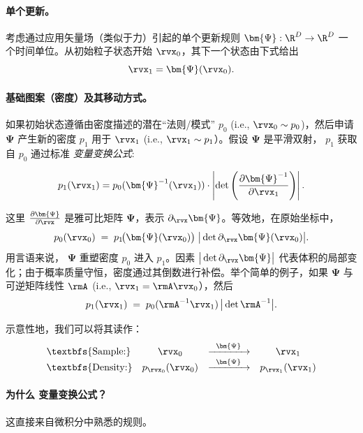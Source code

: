 \paragraph{单个更新。}
考虑通过应用矢量场（类似于力）引起的单个更新规则
$\bm{\Psi}:\R^D \to \R^D$ 一个时间单位。从初始粒子状态开始 $\rvx_0$，其下一个状态由下式给出
\[
\rvx_1 = \bm{\Psi}(\rvx_0).
\]

\paragraph{基础图案（密度）及其移动方式。}
如果初始状态遵循由密度描述的潜在“法则/模式” $p_0$ (i.e., $\rvx_0\sim p_0$)，然后申请 $\bm{\Psi}$ 产生新的密度 $p_1$ 用于 $\rvx_1$ (i.e., $\rvx_1\sim p_1$）。假设 $\bm{\Psi}$ 是平滑双射， $p_1$ 获取自 $p_0$ 通过标准 \emph{变量变换公式}:
\begin{mdframed}
\begin{equation}\label{eq:change-of-variable-density}
p_{1}(\rvx_1) = p_{0}(\bm{\Psi}^{-1}(\rvx_1)) \cdot \left| \det \left( \frac{\partial \bm{\Psi}^{-1}}{\partial \rvx_1} \right) \right|.
\end{equation}
\end{mdframed}
这里 $\tfrac{\partial \bm{\Psi}}{\partial \rvx}$ 是雅可比矩阵 $\bm{\Psi}$，表示 $\partial_\rvx \bm{\Psi}$。等效地，在原始坐标中，
\[
p_0(\rvx_0) \;=\; p_1\!\big(\bm{\Psi}(\rvx_0)\big)\;\big|\det \partial_\rvx \bm{\Psi}(\rvx_0)\big|.
\]
用言语来说， $\bm{\Psi}$ 重塑密度 $p_0$ 进入 $p_1$。因素 $\big|\det \partial_\rvx \bm{\Psi}\big|$ 代表体积的局部变化；由于概率质量守恒，密度通过其倒数进行补偿。举个简单的例子，如果 $\bm{\Psi}$ 与可逆矩阵线性 $\rmA$ (i.e., $\rvx_1=\rmA\rvx_0$），然后
\[
p_1(\rvx_1)\;=\;p_0(\rmA^{-1}\rvx_1)\,\big|\det \rmA^{-1}\big|.
\]

示意性地，我们可以将其读作：
\[
\begin{array}{lccc}
   \text{\textbfs{Sample:}} & \rvx_0 & \xrightarrow{\hspace{0.2cm} \bm{\Psi} \hspace{0.2cm}} & \rvx_1  \\
   \text{\textbfs{Density:}} & p_{\rvx_0}(\rvx_0) & \xrightarrow{\hspace{0.2cm} \bm{\Psi} \hspace{0.2cm}} & p_{\rvx_1}(\rvx_1)
\end{array}
\]

\paragraph{为什么  变量变换公式？}
这直接来自微积分中熟悉的规则。

